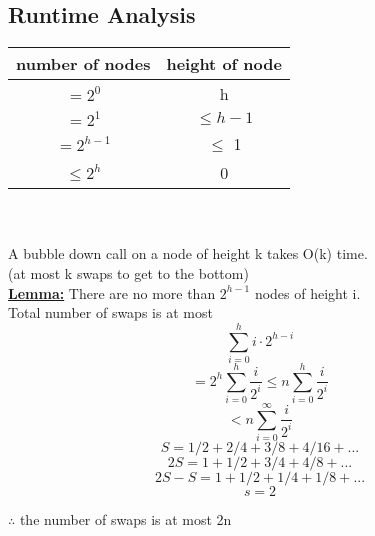 \documentclass[12pt]{article}
\newcommand{\myt}[1]{\textbf{\underline{#1}}}
\begin{document}
	\subsection*{Runtime Analysis}
	\begin{tabular}{c | c }
		number of nodes & height of node \\ \hline
		$=2^0$ & h \\
		$=2^1$ & $\leq h-1$\\
		$=2^{h-1}$ & $\leq$ 1 \\
		$\leq 2^h$ & 0\\
	\end{tabular}\\\\
	
	A bubble down call on a node of height k takes O(k) time.\\
	(at most k swaps to get to the bottom)\\
	\myt{Lemma:} There are no more than $2^{h-1}$ nodes of height i.\\
	
	Total number of swaps is at most 
	$$\sum_{i=0}^{h}i \cdot 2^{h-i}$$
	$$= 2^h \sum_{i=0}^{h} \frac{i}{2^i} \leq n\sum_{i=0}^{h}\frac{i}{2^i}$$
	$$< n \sum_{i=0}^{\infty}\frac{i}{2^i}$$
	$$S = 1/2 + 2/4 + 3/8 + 4/16 + ... $$
	$$2S = 1 + 1/2 + 3/4 + 4/8 + ...$$
	$$2S - S = 1 + 1/2 + 1/4 + 1/8 + ...$$
	$$s = 2$$
	
	$\therefore$ the number of swaps is at most 2n\\
	
	
	
	
	
	
	
\end{document}
